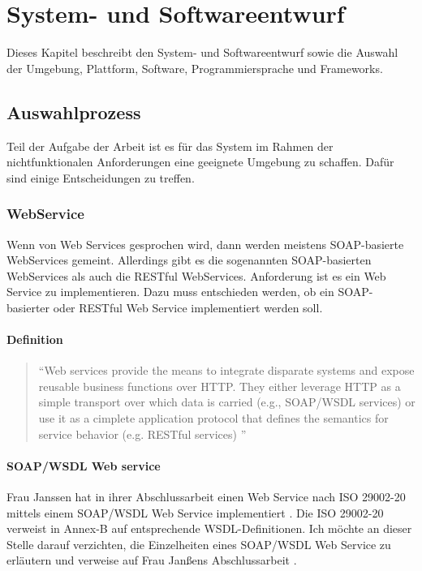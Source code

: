 \chapter{System- und Softwareentwurf} \label{kap:systemundsoftwarentwurf}


Dieses Kapitel beschreibt den System- und Softwareentwurf sowie die Auswahl der Umgebung, Plattform, Software, Programmiersprache und Frameworks.

\section{Auswahlprozess}

Teil der Aufgabe der Arbeit ist es für das System im Rahmen der nichtfunktionalen Anforderungen eine geeignete Umgebung zu schaffen. Dafür sind einige Entscheidungen zu treffen. 

\subsection{WebService}
Wenn von Web Services gesprochen wird, dann werden meistens \gls{SOAP}-basierte WebServices gemeint. Allerdings gibt es die sogenannten \gls{SOAP}-basierten WebServices als auch die RESTful WebServices. Anforderung ist es ein Web Service zu implementieren. Dazu muss entschieden werden, ob ein \gls{SOAP}-basierter oder RESTful Web Service implementiert werden soll.

\subsubsection{Definition}

\begin{quotation}
\enquote{Web services provide the means to integrate disparate systems and expose reusable business functions over HTTP. They either leverage HTTP as a simple transport over which data is carried (e.g., SOAP/\gls{WSDL} services) or use it as a cimplete application protocol that defines the semantics for service behavior (e.g. RESTful services) \citep[S. 2][]{robinsonService}}	
\end{quotation}

\subsubsection{SOAP/WSDL Web service}
Frau Janssen hat in ihrer Abschlussarbeit einen Web Service nach ISO 29002-20 mittels einem SOAP/WSDL Web Service implementiert \citep[vgl.][]{janssen}. Die ISO 29002-20 verweist in Annex-B auf entsprechende WSDL-Definitionen. 
Ich möchte an dieser Stelle darauf verzichten, die Einzelheiten eines SOAP/WSDL Web Service zu erläutern und verweise auf Frau Janßens Abschlussarbeit \citep[vgl.][Kap. 3]{janssen}. 

